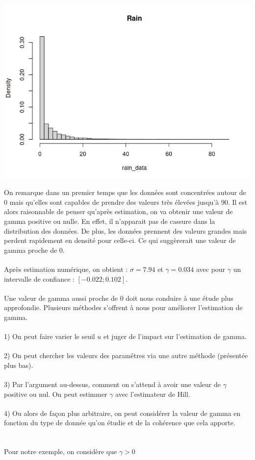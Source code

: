 \documentclass{article}
\begin{document}
\begin{center}
	\includegraphics[scale=0.8]{./images/rainhisto.png} 
\end{center}

On remarque dans un premier temps que les données sont concentrées autour de 0 mais qu'elles sont capables de prendre des valeurs très élevées jusqu'à 90.
Il est alors raisonnable de penser qu'après estimation, on va obtenir une valeur de gamma positive ou nulle. En effet, il n'apparait pas de cassure dans la distribution des données.
De plus, les données prennent des valeurs grandes mais perdent rapidement en densité pour celle-ci. Ce qui suggèrerait une valeur de gamma proche de 0.
\\
\\
Après estimation numérique, on obtient : $\sigma = 7.94$ et $\gamma = 0.034$ avec pour $\gamma$ un intervalle de confiance : $[-0.022 ; 0.102]$.
\\
\\ 
Une valeur de gamma aussi proche de 0 doit nous conduire à une étude plus approfondie.
Plusieurs méthodes s'offrent à nous pour améliorer l'estimation de gamma. 
\\
\\
1) On peut faire varier le seuil $u$ et juger de l'impact sur l'estimation de gamma.
\\
\\
2) On peut chercher les valeurs des paramêtres via une autre méthode (présentée plus bas).
\\
\\
3) Par l'argument au-dessus, comment on s'attend à avoir une valeur de $\gamma$ positive ou nul. On peut estimmer $\gamma$ avec l'estimateur de Hill.
\\
\\
4) Ou alors de façon plus arbitraire, on peut considérer la valeur de gamma en fonction du type de donnée qu'on étudie et de la cohérence que cela apporte.
\\
\\
\\
Pour notre exemple, on considère que $\gamma > 0$
\end{document}
